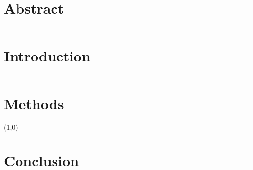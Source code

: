 \documentclass[12pt]{article}
\newcommand{\hr}[1][0.4pt] {\begin{center} \noindent\rule{\textwidth}{#1} \end{center}}
\newcommand{\hrtwo}{\begin{center} \line(1,0){\textwidth} \end{center}}
\begin{document}
\section{Abstract}
\blindtext
\hr %


\section{Introduction}
\blindtext
\textcolor{blue}{\hr[1.2pt]}


\section{Methods}
\blindtext
\hrtwo


\section{Conclusion}
\blindtext
\end{document}
